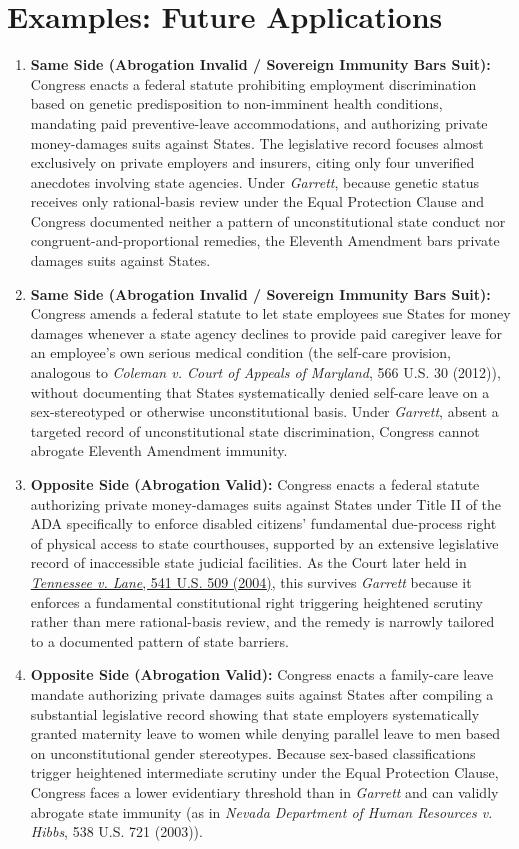 \documentclass[12pt]{article}
\begin{document}
\section{Examples: Future Applications}

\begin{enumerate}
\item \textbf{Same Side (Abrogation Invalid / Sovereign Immunity Bars Suit):} Congress enacts a federal statute prohibiting employment discrimination based on genetic predisposition to non-imminent health conditions, mandating paid preventive-leave accommodations, and authorizing private money-damages suits against States. The legislative record focuses almost exclusively on private employers and insurers, citing only four unverified anecdotes involving state agencies. Under \textit{Garrett}, because genetic status receives only rational-basis review under the Equal Protection Clause and Congress documented neither a pattern of unconstitutional state conduct nor congruent-and-proportional remedies, the Eleventh Amendment bars private damages suits against States.
\item \textbf{Same Side (Abrogation Invalid / Sovereign Immunity Bars Suit):} Congress amends a federal statute to let state employees sue States for money damages whenever a state agency declines to provide paid caregiver leave for an employee's own serious medical condition (the self-care provision, analogous to \textit{Coleman v. Court of Appeals of Maryland}, 566 U.S. 30 (2012)), without documenting that States systematically denied self-care leave on a sex-stereotyped or otherwise unconstitutional basis. Under \textit{Garrett}, absent a targeted record of unconstitutional state discrimination, Congress cannot abrogate Eleventh Amendment immunity.
\item \textbf{Opposite Side (Abrogation Valid):} Congress enacts a federal statute authorizing private money-damages suits against States under Title II of the ADA specifically to enforce disabled citizens' fundamental due-process right of physical access to state courthouses, supported by an extensive legislative record of inaccessible state judicial facilities. As the Court later held in \href{https://supreme.justia.com/cases/federal/us/541/509/}{\textit{Tennessee v. Lane}, 541 U.S. 509 (2004)}, this survives \textit{Garrett} because it enforces a fundamental constitutional right triggering heightened scrutiny rather than mere rational-basis review, and the remedy is narrowly tailored to a documented pattern of state barriers.
\item \textbf{Opposite Side (Abrogation Valid):} Congress enacts a family-care leave mandate authorizing private damages suits against States after compiling a substantial legislative record showing that state employers systematically granted maternity leave to women while denying parallel leave to men based on unconstitutional gender stereotypes. Because sex-based classifications trigger heightened intermediate scrutiny under the Equal Protection Clause, Congress faces a lower evidentiary threshold than in \textit{Garrett} and can validly abrogate state immunity (as in \textit{Nevada Department of Human Resources v. Hibbs}, 538 U.S. 721 (2003)).

\end{enumerate}
\end{document}

